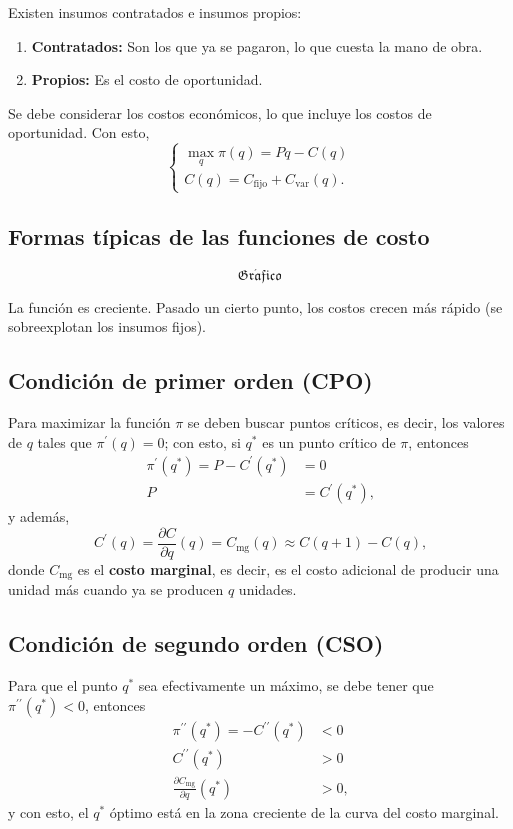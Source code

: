 \documentclass{report}
\newcommand{\GRAF}{\begin{center}$$\mathfrak{Gr\acute{a}fico}$$\end{center}}
\begin{document}
Existen insumos contratados e insumos propios:
\begin{enumerate}
\item \textbf{Contratados:} Son los que ya se pagaron, lo que cuesta la mano de obra.
\item \textbf{Propios:} Es el costo de oportunidad.
\end{enumerate}

Se debe considerar los costos económicos, lo que incluye los costos de oportunidad. Con esto,
\[
\begin{cases}
\displaystyle{\max_q\pi\!\left(q\right)=Pq-C\!\left(q\right)} \\
C\!\left(q\right)=C_\text{fijo}+C_\text{var}\!\left(q\right)\text{.}
\end{cases}
\]

\subsection{Formas típicas de las funciones de costo}

\GRAF

La función es creciente. Pasado un cierto punto, los costos crecen más rápido (se sobreexplotan los insumos fijos).

\subsection{Condición de primer orden (CPO)}

Para maximizar la función $\pi$ se deben buscar puntos críticos, es decir, los valores de $q$ tales que $\pi^\prime\!\left(q\right)=0$; con esto, si $q^*$ es un punto crítico de $\pi$, entonces
\begin{align*}
\pi^\prime\!\left(q^*\right)=P-C^\prime\!\left(q^*\right) & = 0 \\
P & = C^\prime\!\left(q^*\right)\text{,}
\end{align*}
y además,
\[
C^\prime\!\left(q\right)=\frac{\partial C}{\partial q}\!\left(q\right)=C_\text{mg}\!\left(q\right)\approx C\!\left(q+1\right)-C\!\left(q\right)\text{,}
\]
donde $C_\text{mg}$ es el \textbf{costo marginal}, es decir, es el costo adicional de producir una unidad más cuando ya se producen $q$ unidades.

\subsection{Condición de segundo orden (CSO)}

Para que el punto $q^*$ sea efectivamente un máximo, se debe tener que $\pi^{\prime\prime}\!\left(q^*\right)<0$, entonces
\begin{align*}
\pi^{\prime\prime}\!\left(q^*\right) = -C^{\prime\prime}\!\left(q^*\right) & < 0 \\
C^{\prime\prime}\!\left(q^*\right) & > 0 \\
\frac{\partial C_\text{mg}}{\partial q}\!\left(q^*\right) & > 0\text{,}
\end{align*}
y con esto, el $q^*$ óptimo está en la zona creciente de la curva del costo marginal.
\end{document}
